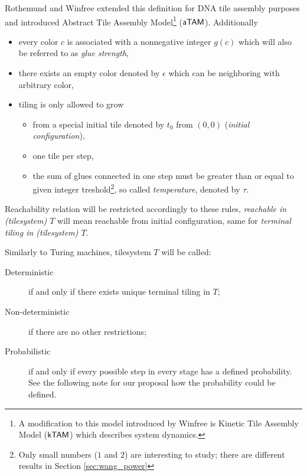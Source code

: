 	Rothemund and Winfree \cite{square_lb} extended this definition for DNA tile assembly purposes and introduced Abstract Tile Assembly Model\footnote{A modification to this model introduced by Winfree is Kinetic Tile Assembly Model ($\mathsf{kTAM}$) which describes system dynamics.} ($\mathsf{aTAM}$). Additionally
	\begin{itemize}
		\item every color $c$ is associated with a nonnegative integer $g(c)$ which will also be referred to as {\em glue strength},
		\item there exists an empty color denoted by $\epsilon$ which can be neighboring with arbitrary color,
		\item tiling is only allowed to grow
		\begin{itemize}
			\item from a special initial tile denoted by $t_0$ from $(0,0)$ ({\em initial configuration}),
			\item one tile per step,
			\item the sum of glues connected in one step must be greater than or equal to given integer treshold\footnote{Only small numbers ($1$ and $2$) are interesting to study; there are different results in Section \ref{sec:wang_power}}, so called {\em temperature}, denoted by $\tau$.
		\end{itemize}
	\end{itemize}
	Reachability relation will be restricted accordingly to these rules, {\em reachable in (tilesystem) $T$} will mean reachable from initial configuration, same for {\em terminal tiling in (tilesystem) $T$}.
	
	Similarly to Turing machines, tilesystem $T$ will be called:
	\begin{description}
		\item[Deterministic] if and only if there exists unique terminal tiling in $T$; %
		\item[Non-deterministic] if there are no other restrictions;
		\item[Probabilistic] if and only if every possible step in every stage has a defined probability. See the following note for our proposal how the probability could be defined.
	\end{description}
	
